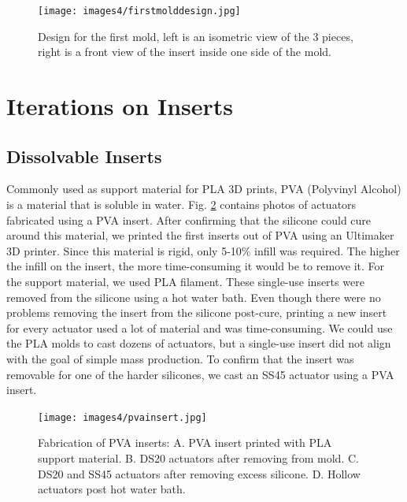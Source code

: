 \begin{figure}[ht]
    \centering
    \texttt{[image: images4/firstmolddesign.jpg]}
    \caption{Design for the first mold, left is an isometric view of the 3 pieces, right is a front view of the insert inside one side of the mold.}
    \label{fig:firstmold}
\end{figure}

\clearpage
\section{Iterations on Inserts}
\subsection{Dissolvable Inserts}
Commonly used as support material for PLA 3D prints, PVA (Polyvinyl Alcohol) is a material that is soluble in water. Fig. \ref{fig:pvainsert} contains photos of actuators fabricated using a PVA insert. After confirming that the silicone could cure around this material, we printed the first inserts out of PVA using an Ultimaker 3D printer. Since this material is rigid, only 5-10\% infill was required. The higher the infill on the insert, the more time-consuming it would be to remove it. For the support material, we used PLA filament. These single-use inserts were removed from the silicone using a hot water bath. Even though there were no problems removing the insert from the silicone post-cure, printing a new insert for every actuator used a lot of material and was time-consuming. We could use the PLA molds to cast dozens of actuators, but a single-use insert did not align with the goal of simple mass production. To confirm that the insert was removable for one of the harder silicones, we cast an SS45 actuator using a PVA insert.  

\begin{figure}[ht]
    \centering
    \texttt{[image: images4/pvainsert.jpg]}
    \caption{Fabrication of PVA inserts: A. PVA insert printed with PLA support material. B. DS20 actuators after removing from mold. C. DS20 and SS45 actuators after removing excess silicone. D. Hollow actuators post hot water bath.}
    \label{fig:pvainsert}
\end{figure}

\clearpage
